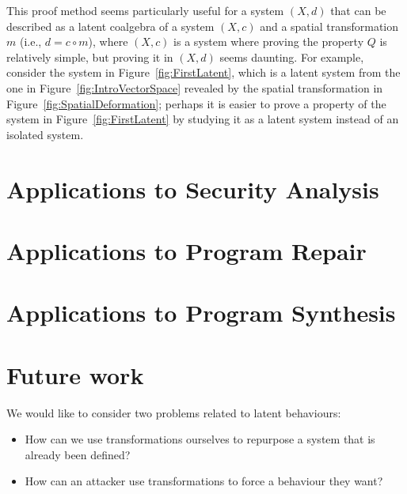 This proof method seems particularly useful for a system $(X,d)$ that can be described as a latent coalgebra of a system $(X,c)$ and a spatial transformation $m$ (i.e., $d=c\circ m$), where $(X,c)$ is a system where proving the property $Q$ is relatively simple, but proving it in $(X,d)$ seems daunting. For example, consider the system in Figure~\ref{fig:FirstLatent}, which is a latent system from the one in Figure~\ref{fig:IntroVectorSpace} revealed by the spatial transformation in Figure~\ref{fig:SpatialDeformation}; perhaps it is easier to prove a property of the system in Figure~\ref{fig:FirstLatent} by studying it as a latent system instead of an isolated system. 

\section{Applications to Security Analysis}
\section{Applications to Program Repair}
\section{Applications to Program Synthesis}
\section{Future work}
We would like to consider two problems related to latent behaviours: 
\begin{itemize}
\item How can we use transformations ourselves to repurpose a system that is already been defined?
\item How can an attacker use transformations to force a behaviour they want?
\end{itemize}
